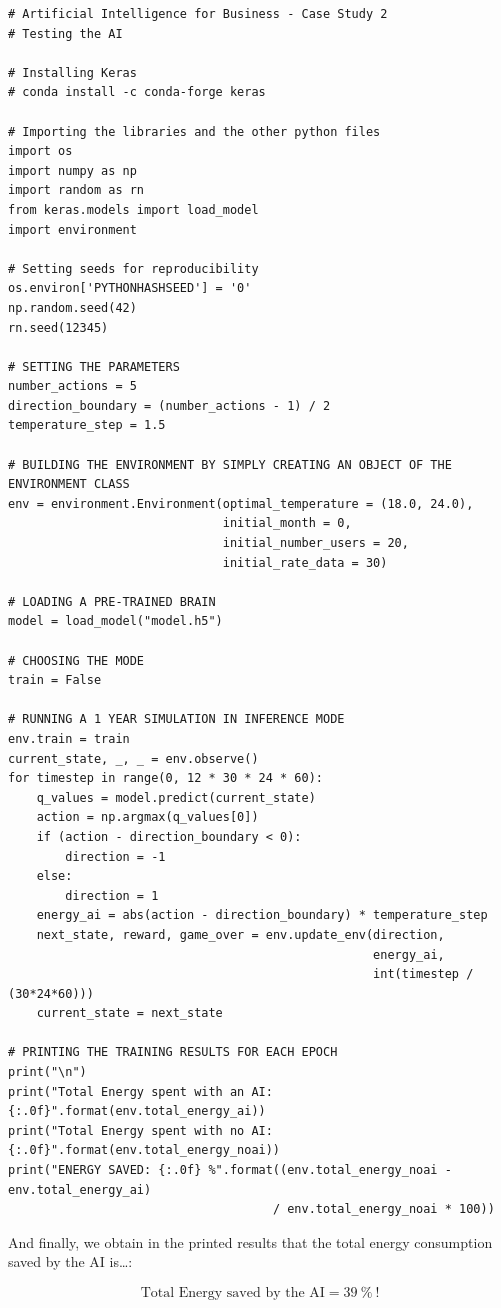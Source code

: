 \documentclass[]{book}
\begin{document}
\begin{lstlisting}
# Artificial Intelligence for Business - Case Study 2
# Testing the AI

# Installing Keras
# conda install -c conda-forge keras

# Importing the libraries and the other python files
import os
import numpy as np
import random as rn
from keras.models import load_model
import environment

# Setting seeds for reproducibility
os.environ['PYTHONHASHSEED'] = '0'
np.random.seed(42)
rn.seed(12345)

# SETTING THE PARAMETERS
number_actions = 5
direction_boundary = (number_actions - 1) / 2
temperature_step = 1.5

# BUILDING THE ENVIRONMENT BY SIMPLY CREATING AN OBJECT OF THE ENVIRONMENT CLASS
env = environment.Environment(optimal_temperature = (18.0, 24.0),
                              initial_month = 0,
                              initial_number_users = 20,
                              initial_rate_data = 30)

# LOADING A PRE-TRAINED BRAIN
model = load_model("model.h5")

# CHOOSING THE MODE
train = False

# RUNNING A 1 YEAR SIMULATION IN INFERENCE MODE
env.train = train
current_state, _, _ = env.observe()
for timestep in range(0, 12 * 30 * 24 * 60):
    q_values = model.predict(current_state)
    action = np.argmax(q_values[0])
    if (action - direction_boundary < 0):
        direction = -1
    else:
        direction = 1
    energy_ai = abs(action - direction_boundary) * temperature_step
    next_state, reward, game_over = env.update_env(direction,
                                                   energy_ai,
                                                   int(timestep / (30*24*60)))
    current_state = next_state

# PRINTING THE TRAINING RESULTS FOR EACH EPOCH
print("\n")
print("Total Energy spent with an AI: {:.0f}".format(env.total_energy_ai))
print("Total Energy spent with no AI: {:.0f}".format(env.total_energy_noai))
print("ENERGY SAVED: {:.0f} %".format((env.total_energy_noai - env.total_energy_ai)
                                     / env.total_energy_noai * 100))
\end{lstlisting}

And finally, we obtain in the printed results that the total energy consumption saved by the AI is\ldots{}:

\begin{equation*}
    \textrm{Total Energy saved by the AI} = 39 \ \% \ !
\end{equation*}
\end{document}
